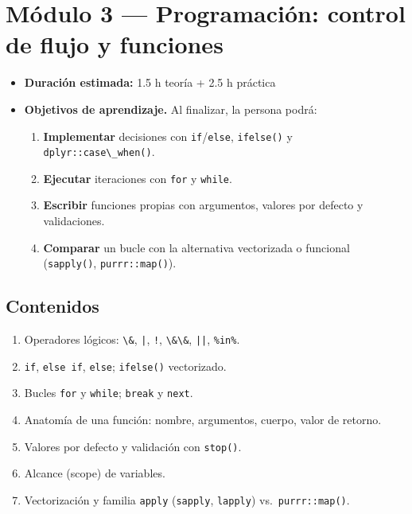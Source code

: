 \chapter{Módulo 3 --- Programación: control de flujo y funciones}

\begin{itemize}
\tightlist
\item
  \textbf{Duración estimada:} 1.5 h teoría + 2.5 h práctica
\item
  \textbf{Objetivos de aprendizaje.} Al finalizar, la persona podrá:

  \begin{enumerate}
  \def\labelenumi{\arabic{enumi}.}
  \tightlist
  \item
    \textbf{Implementar} decisiones con
    \passthrough{\lstinline!if!}/\passthrough{\lstinline!else!},
    \passthrough{\lstinline!ifelse()!} y
    \passthrough{\lstinline!dplyr::case\_when()!}.
  \item
    \textbf{Ejecutar} iteraciones con \passthrough{\lstinline!for!} y
    \passthrough{\lstinline!while!}.
  \item
    \textbf{Escribir} funciones propias con argumentos, valores por
    defecto y validaciones.
  \item
    \textbf{Comparar} un bucle con la alternativa vectorizada o
    funcional (\passthrough{\lstinline!sapply()!},
    \passthrough{\lstinline!purrr::map()!}).
  \end{enumerate}
\end{itemize}

\section{Contenidos}

\begin{enumerate}
\def\labelenumi{\arabic{enumi}.}
\tightlist
\item
  Operadores lógicos: \passthrough{\lstinline!\&!},
  \passthrough{\lstinline!|!}, \passthrough{\lstinline"!"},
  \passthrough{\lstinline!\&\&!}, \passthrough{\lstinline!||!},
  \passthrough{\lstinline!\%in\%!}.
\item
  \passthrough{\lstinline!if!}, \passthrough{\lstinline!else if!},
  \passthrough{\lstinline!else!}; \passthrough{\lstinline!ifelse()!}
  vectorizado.
\item
  Bucles \passthrough{\lstinline!for!} y
  \passthrough{\lstinline!while!}; \passthrough{\lstinline!break!} y
  \passthrough{\lstinline!next!}.
\item
  Anatomía de una función: nombre, argumentos, cuerpo, valor de retorno.
\item
  Valores por defecto y validación con \passthrough{\lstinline!stop()!}.
\item
  Alcance (scope) de variables.
\item
  Vectorización y familia \passthrough{\lstinline!apply!}
  (\passthrough{\lstinline!sapply!}, \passthrough{\lstinline!lapply!})
  vs.~\passthrough{\lstinline!purrr::map()!}.
\end{enumerate}

